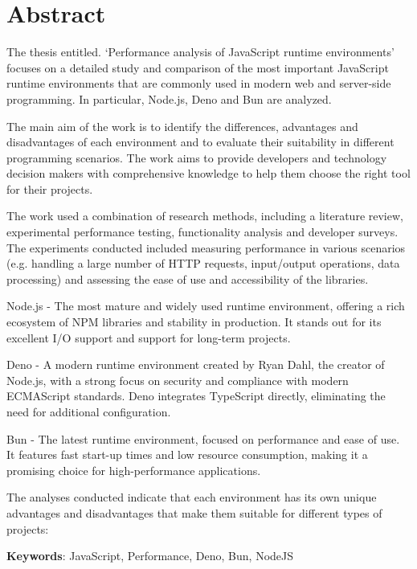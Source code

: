 \section*{Abstract}
The thesis entitled. ‘Performance analysis of JavaScript runtime environments’ focuses on a detailed study and comparison of the most important JavaScript runtime environments that are commonly used in modern web and server-side programming. In particular, Node.js, Deno and Bun are analyzed.

The main aim of the work is to identify the differences, advantages and disadvantages of each environment and to evaluate their suitability in different programming scenarios. The work aims to provide developers and technology decision makers with comprehensive knowledge to help them choose the right tool for their projects.

The work used a combination of research methods, including a literature review, experimental performance testing, functionality analysis and developer surveys. The experiments conducted included measuring performance in various scenarios (e.g. handling a large number of HTTP requests, input/output operations, data processing) and assessing the ease of use and accessibility of the libraries.

Node.js - The most mature and widely used runtime environment, offering a rich ecosystem of NPM libraries and stability in production. It stands out for its excellent I/O support and support for long-term projects.

Deno - A modern runtime environment created by Ryan Dahl, the creator of Node.js, with a strong focus on security and compliance with modern ECMAScript standards. Deno integrates TypeScript directly, eliminating the need for additional configuration.

Bun - The latest runtime environment, focused on performance and ease of use. It features fast start-up times and low resource consumption, making it a promising choice for high-performance applications.

The analyses conducted indicate that each environment has its own unique advantages and disadvantages that make them suitable for different types of projects:

\bigskip

\textbf{Keywords}: JavaScript, Performance, Deno, Bun, NodeJS
